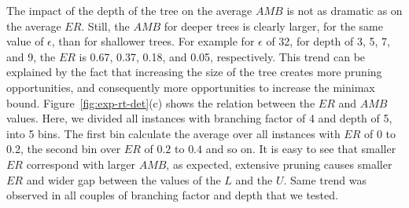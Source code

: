 \documentclass[runningheads]{llncs}
\newcommand{\pess}{\mathit{L}}
\newcommand{\opti}{\mathit{U}}
\newcommand{\amb}{\mathit{AMB}}
\newcommand{\er}{\mathit{ER}}
\begin{document}
The impact of the depth of the tree on the average $\amb$ is not as dramatic as on the average $\er$.
Still, the $\amb$ for deeper trees is clearly larger, for the same value of $\epsilon$, than for shallower trees.
For example for $\epsilon$ of 32, for depth of 3, 5, 7, and 9, the $\er$ is 0.67, 0.37, 0.18, and 0.05, respectively.
This trend can be explained by the fact that increasing the size of the tree creates more pruning opportunities, and consequently more opportunities to increase the minimax bound. 
Figure~\ref{fig:exp-rt-det}(c) shows the relation between the $\er$ and $\amb$ values.
Here, we divided all instances with branching factor of 4 and depth of 5, into 5 bins.
The first bin calculate the average over all instances with $\er$ of $0$ to $0.2$, the second bin over $\er$ of $0.2$ to $0.4$ and so on.
It is easy to see that smaller $\er$ correspond with larger $\amb$, as expected, extensive pruning causes smaller $\er$ and wider gap between the values of the $\pess$ and the $\opti$.
Same trend was observed in all couples of branching factor and depth that we tested. 
\end{document}
